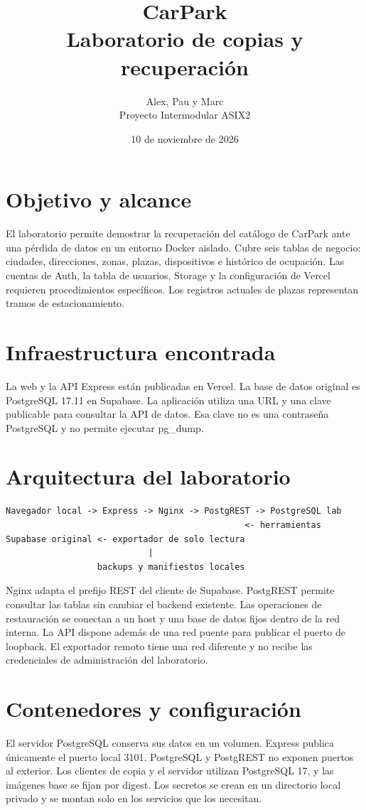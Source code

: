 \documentclass[11pt,a4paper]{article}
\title{CarPark\\Laboratorio de copias y recuperación}
\author{Alex, Pau y Marc\\Proyecto Intermodular ASIX2}
\date{10 de noviembre de 2026}
\begin{document}
\maketitle

\section{Objetivo y alcance}
El laboratorio permite demostrar la recuperación del catálogo de CarPark ante una pérdida de datos en un entorno Docker aislado. Cubre seis tablas de negocio: ciudades, direcciones, zonas, plazas, dispositivos e histórico de ocupación. Las cuentas de Auth, la tabla de usuarios, Storage y la configuración de Vercel requieren procedimientos específicos. Los registros actuales de plazas representan tramos de estacionamiento.

\section{Infraestructura encontrada}
La web y la API Express están publicadas en Vercel. La base de datos original es PostgreSQL 17.11 en Supabase. La aplicación utiliza una URL y una clave publicable para consultar la API de datos. Esa clave no es una contraseña PostgreSQL y no permite ejecutar pg\_dump.

\section{Arquitectura del laboratorio}
\begin{verbatim}
Navegador local -> Express -> Nginx -> PostgREST -> PostgreSQL lab
                                               <- herramientas
Supabase original <- exportador de solo lectura
                            |
                  backups y manifiestos locales
\end{verbatim}
Nginx adapta el prefijo REST del cliente de Supabase. PostgREST permite consultar las tablas sin cambiar el backend existente. Las operaciones de restauración se conectan a un host y una base de datos fijos dentro de la red interna. La API dispone además de una red puente para publicar el puerto de loopback. El exportador remoto tiene una red diferente y no recibe las credenciales de administración del laboratorio.

\section{Contenedores y configuración}
El servidor PostgreSQL conserva sus datos en un volumen. Express publica únicamente el puerto local 3101. PostgreSQL y PostgREST no exponen puertos al exterior. Los clientes de copia y el servidor utilizan PostgreSQL 17, y las imágenes base se fijan por digest. Los secretos se crean en un directorio local privado y se montan solo en los servicios que los necesitan.
\end{document}
